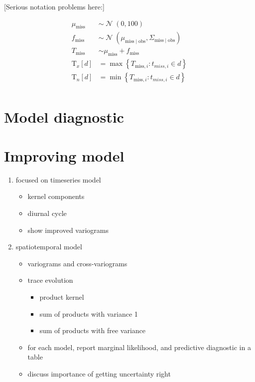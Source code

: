 \documentclass[letter]{article}
\providecommand{\tightlist}{%
      \setlength{\itemsep}{0pt}\setlength{\parskip}{0pt}}
\newcommand{\genericdel}[3]{%
      \left#1#3\right#2
    }
\newcommand{\del}[1]{\genericdel(){#1}}
\newcommand{\sbr}[1]{\genericdel[]{#1}}
\newcommand{\cbr}[1]{\genericdel\{\}{#1}}
\DeclareMathOperator{\normal}{\mathcal{N}}
\newcommand{\Tn}{\mathrm{T}_{n}}
\newcommand{\Tx}{\mathrm{T}_{x}}
\newcommand{\miss}{\mathrm{miss}}
\newcommand{\obs}{\mathrm{obs}}
\providecommand{\tightlist}{%
  	  \setlength{\itemsep}{0pt}\setlength{\parskip}{0pt}}
\begin{document}
{[}Serious notation problems here:{]}

\begin{align}
    \mu_\miss &\sim \normal\del{0,100} \\
    f_\miss &\sim \normal\del{\mu_{\miss \mid \obs}, \Sigma_{\miss \mid \obs}} \\
    T_\miss &\sim \mu_\miss + f_\miss \\
    \Tx\sbr{d} &= \max\cbr{ T_{\miss,i}: t_{miss,i} \in d } \\
    \Tn\sbr{d} &= \min\cbr{ T_{\miss,i}: t_{miss,i} \in d } \\
\end{align}
    


    	\section{Model diagnostic}\label{model-diagnostic}
    


    	\section{Improving model}\label{improving-model}

\begin{enumerate}
\def\labelenumi{\arabic{enumi}.}
\tightlist
\item
  focused on timeseries model

  \begin{itemize}
  \tightlist
  \item
    kernel components
  \item
    diurnal cycle
  \item
    show improved variograms
  \end{itemize}
\item
  spatiotemporal model

  \begin{itemize}
  \tightlist
  \item
    variograms and cross-variograms
  \item
    trace evolution

    \begin{itemize}
    \tightlist
    \item
      product kernel
    \item
      sum of products with variance 1
    \item
      sum of products with free variance
    \end{itemize}
  \item
    for each model, report marginal likelihood, and predictive
    diagnostic in a table
  \item
    discuss importance of getting uncertainty right
  \end{itemize}
\end{enumerate}
\end{document}
